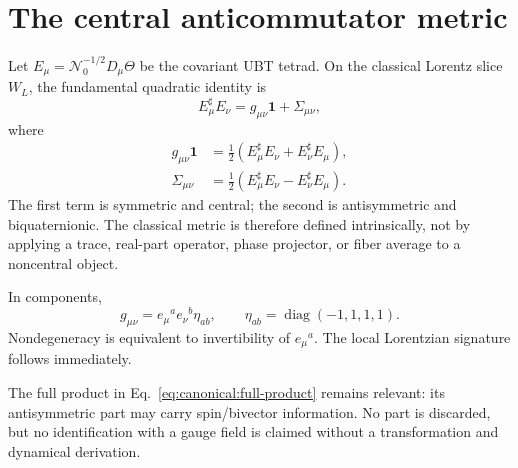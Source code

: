 
\section{The central anticommutator metric}
\label{sec:canonical:biquaternion_metric}

Let $E_\mu=\mathcal N_0^{-1/2}D_\mu\Theta$ be the covariant UBT tetrad.  On the
classical Lorentz slice $W_L$, the fundamental quadratic identity is
\begin{equation}
 \boxed{E_\mu^\sharp E_\nu
       =g_{\mu\nu}\mathbf1+\Sigma_{\mu\nu},}
 \label{eq:canonical:full-product}
\end{equation}
where
\begin{align}
 g_{\mu\nu}\mathbf1
 &=\frac12(E_\mu^\sharp E_\nu+E_\nu^\sharp E_\mu),\\
 \Sigma_{\mu\nu}
 &=\frac12(E_\mu^\sharp E_\nu-E_\nu^\sharp E_\mu).
\end{align}
The first term is symmetric and central; the second is antisymmetric and
biquaternionic.  The classical metric is therefore defined intrinsically, not
by applying a trace, real-part operator, phase projector, or fiber average to a
noncentral object.

In components,
\begin{equation}
 g_{\mu\nu}=e_\mu{}^a e_\nu{}^b\eta_{ab},
 \qquad \eta_{ab}=\operatorname{diag}(-1,1,1,1).
\end{equation}
Nondegeneracy is equivalent to invertibility of $e_\mu{}^a$.  The local
Lorentzian signature follows immediately.

The full product in Eq.~\eqref{eq:canonical:full-product} remains relevant: its
antisymmetric part may carry spin/bivector information.  No part is discarded,
but no identification with a gauge field is claimed without a transformation
and dynamical derivation.

